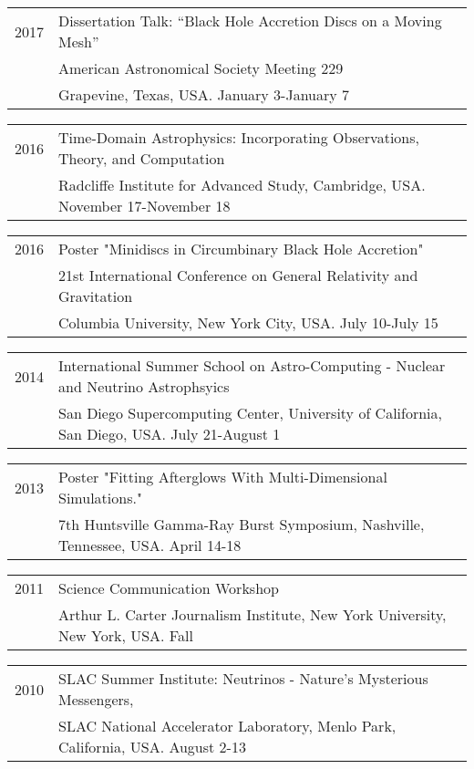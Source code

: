\documentclass[letterpaper]{article}
\renewenvironment{itemize}{
  \begin{list}{}{
    \setlength{\leftmargin}{1.5em}
  }
}{
  \end{list}
}
\begin{document}
\begin{itemize}
\item \begin{tabular}{ll}
2017 & Dissertation Talk: ``Black Hole Accretion Discs on a Moving Mesh'' \\
	 & American Astronomical Society Meeting 229 \\
	 & Grapevine, Texas, USA. January 3-January 7
\end{tabular}
\item \begin{tabular}{ll}
2016 & Time-Domain Astrophysics: Incorporating Observations, Theory, and Computation \\
	 & Radcliffe Institute for Advanced Study, Cambridge, USA. November 17-November 18
\end{tabular}
\item \begin{tabular}{ll}
2016 & Poster "Minidiscs in Circumbinary Black Hole Accretion" \\
	& 21st International Conference on General Relativity and Gravitation \\ 
	& Columbia University, New York City, USA. July 10-July 15
\end{tabular}

\item \begin{tabular}{ll}
2014 & International Summer School on Astro-Computing - Nuclear and Neutrino Astrophsyics \\ 
	& San Diego Supercomputing Center, University of California, San Diego, USA. July 21-August 1
\end{tabular}

\item \begin{tabular}{ll}
2013 & Poster "Fitting Afterglows With Multi-Dimensional Simulations." \\ 
	&7th Huntsville Gamma-Ray Burst Symposium, Nashville, Tennessee, USA.  April 14-18 \\
\end{tabular}

\item \begin{tabular}{ll}
2011 & Science Communication Workshop\\
	& Arthur L. Carter Journalism Institute, New York University, New York, USA.  Fall \\
\end{tabular}

\item \begin{tabular}{ll}
2010 & SLAC Summer Institute: Neutrinos - Nature's Mysterious Messengers, \\ 
	 & SLAC National Accelerator Laboratory, Menlo Park, California, USA.  August 2-13\\
\end{tabular}
\end{itemize}
\end{document}

